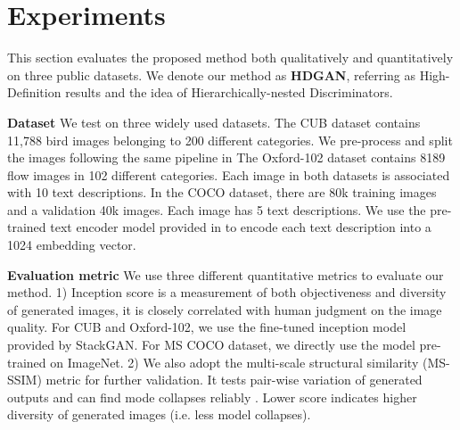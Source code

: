 \documentclass[10pt,twocolumn,letterpaper]{article}
\begin{document}
\section{Experiments}
This section evaluates the proposed method both qualitatively and quantitatively on three public datasets. We denote our method as \textbf{HDGAN}, referring as High-Definition results and the idea of Hierarchically-nested Discriminators.

\textbf{Dataset} 
We test on three widely used datasets. The CUB dataset \cite{welinder2010caltech} contains 11,788 bird images belonging to 200 different categories. We pre-process and split the images following the same pipeline in \cite{reed2016generative,han2017stackgan}
The Oxford-102 dataset \cite{Nilsback08} contains 8189 flow images in 102 different categories. 
Each image in both datasets is associated with 10 text descriptions. In the COCO dataset, \cite{lin2014microsoft} there are 80k training images and a validation 40k images.  Each image has 5 text descriptions. 
We use the pre-trained text encoder model provided in \cite{reed2016generative} to encode each text description into a 1024 embedding vector.


\textbf{Evaluation metric}
We use three different quantitative metrics to evaluate our method.
1) Inception score \cite{improvedGAN} is a measurement of both objectiveness and diversity of generated images, it is closely correlated with human judgment on the image quality. For CUB and Oxford-102, we use the fine-tuned inception model provided by StackGAN. For MS COCO dataset, we directly use the model pre-trained on ImageNet.
2) We also adopt the multi-scale structural similarity (MS-SSIM) metric \cite{improvedGAN} for further validation. It tests pair-wise variation of generated outputs and can find mode collapses reliably \cite{odena2016conditional}. Lower score indicates higher diversity of generated images (i.e. less model collapses). 
\end{document}
